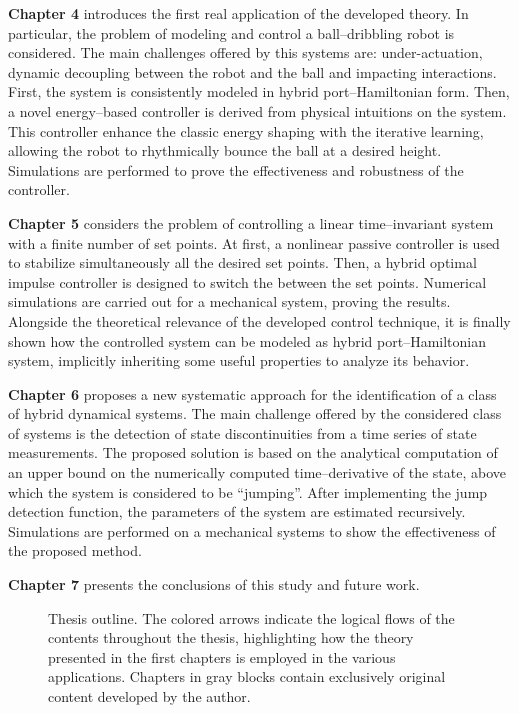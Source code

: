 %
\textbf{Chapter 4} introduces the first real application of the developed theory. In particular, the problem of modeling and control a ball--dribbling robot is considered. The main challenges offered by this systems are: under-actuation, dynamic decoupling between the robot and the ball and impacting interactions. First, the system is consistently modeled in hybrid port--Hamiltonian form. Then, a novel energy--based controller is derived from physical intuitions on the system. This controller enhance the classic energy shaping with the iterative learning, allowing the robot to rhythmically bounce the ball at a desired height. Simulations are performed to prove the effectiveness and robustness of the controller.   
%
\newline

%
\textbf{Chapter 5} considers the problem of controlling a linear time--invariant system with a finite number of set points. At first, a nonlinear passive controller is used to stabilize simultaneously all the desired set points. Then, a hybrid optimal impulse controller is designed to switch the between the set points. Numerical simulations are carried out for a mechanical system, proving the results. Alongside the theoretical relevance of the developed control technique, it is finally shown how the controlled system can be modeled as hybrid port--Hamiltonian system, implicitly inheriting some useful properties to analyze its behavior.
%
\newline

%
\textbf{Chapter 6} proposes a new systematic approach for the identification of a class of hybrid dynamical systems. The main challenge offered by the considered class of systems is the detection of state discontinuities from a time series of state measurements. The proposed solution is based on the analytical computation of an upper bound on the numerically computed time--derivative of the state, above which the system is considered to be ``jumping''. After implementing the jump detection function, the parameters of the system are estimated recursively. Simulations are performed on a mechanical systems to show the effectiveness of the proposed method.
\newline

%
\textbf{Chapter 7} presents the conclusions of this study and future work.
%
\begin{figure}[b]
    \centering
    
    \vspace{5mm}
    \caption[Thesis outline.]{Thesis outline. The colored arrows indicate the logical flows of the contents throughout the thesis, highlighting how the theory presented in the first chapters is employed in the various applications. Chapters in gray blocks contain exclusively original content developed by the author.}
    \label{fig:ThesisStructure}
\end{figure}
%
%
%

